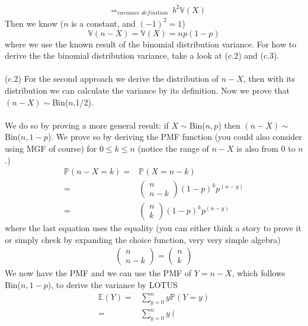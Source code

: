 \begin{exercise} [BH.4.21]
\begin{solution}
\begin{enumerate}
\begin{align*}
			&=_{\textit{variance definition~}} b^2\mathbb{V}(X) 
		\end{align*} 
		Then we know ($n$ is a constant, and $(-1)^2=1$)  $$\mathbb{V}(n-X)=\mathbb{V}(X)=np(1-p)$$ where we use the known result of the binomial distribution variance. For how to derive the the binomial distribution variance, take a look at (c.2) and (c.3).\\~\\ (c.2) For the second approach we derive the distribution of $n-X$, then with its distribution we can calculate the variance by its definition. Now we prove that  $(n-X)\sim$Bin($n$,1/2).  \\~\\
		We do so by proving a more general result: if $X\sim$Bin($n,p$) then $(n-X)\sim$Bin($n,1-p$). We prove so by deriving the PMF function (you could also consider using MGF of course) for $0\leq k\leq n$ (notice the range of $n-X$ is also from 0 to $n$.)
		\begin{align*}
			\mathbb{P}\left(n-X= k \right)=& \mathbb{P}\left(X= n-k \right)\\=& 
			\left(\begin{matrix}
				n \\ n-k
			\end{matrix} \right) (1-p)^kp^{(n-y)}\\=& 
			\left(\begin{matrix}
				n \\ k
			\end{matrix} \right) (1-p)^kp^{(n-y)}
		\end{align*}
		where the last equation uses the equality (you can either think a story to prove it or simply check by expanding the choice function, very very simple algebra)
		\begin{align*}
			\left(\begin{matrix}
				n \\ n-k
			\end{matrix} \right)= 
			\left(\begin{matrix}
				n \\ k
			\end{matrix} \right)
		\end{align*}
		We now have the PMF and we can use the PMF of $Y=n-X$, which follows Bin($n,1-p$), to derive the variance by LOTUS
		\begin{align*}
			\mathbb{E}(Y) =	 
			& \sum_{y=0}^{n} y \mathbb{P}(Y=y) \\=& \sum_{y=0}^{n} y 	\left(\begin{matrix}

\end{matrix}
\end{align*}
\end{enumerate}
\end{solution}
\end{exercise}
